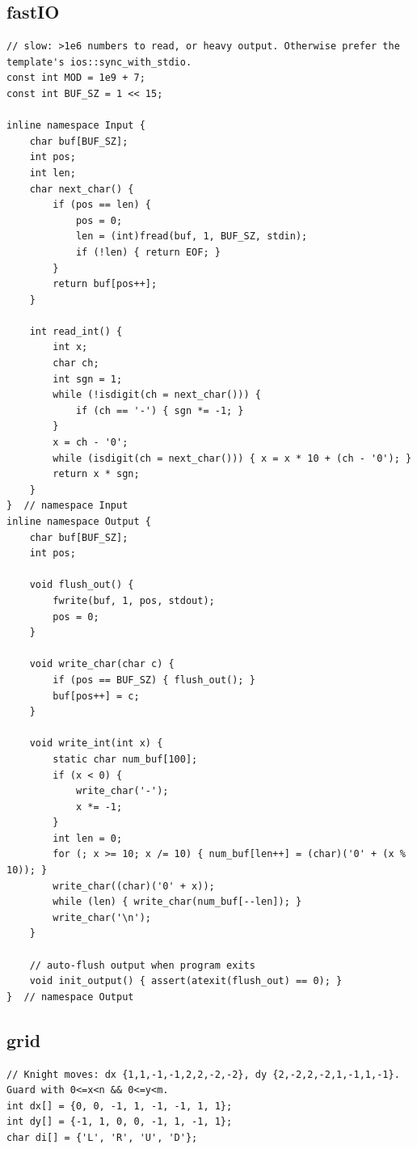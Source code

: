 \documentclass[9pt,a4paper,twocolumn]{extarticle}
\begin{document}
\filbreak
\subsection{fastIO}
\nopagebreak
\begin{lstlisting}
// slow: >1e6 numbers to read, or heavy output. Otherwise prefer the template's ios::sync_with_stdio.
const int MOD = 1e9 + 7;
const int BUF_SZ = 1 << 15;

inline namespace Input {
    char buf[BUF_SZ];
    int pos;
    int len;
    char next_char() {
        if (pos == len) {
            pos = 0;
            len = (int)fread(buf, 1, BUF_SZ, stdin);
            if (!len) { return EOF; }
        }
        return buf[pos++];
    }

    int read_int() {
        int x;
        char ch;
        int sgn = 1;
        while (!isdigit(ch = next_char())) {
            if (ch == '-') { sgn *= -1; }
        }
        x = ch - '0';
        while (isdigit(ch = next_char())) { x = x * 10 + (ch - '0'); }
        return x * sgn;
    }
}  // namespace Input
inline namespace Output {
    char buf[BUF_SZ];
    int pos;

    void flush_out() {
        fwrite(buf, 1, pos, stdout);
        pos = 0;
    }

    void write_char(char c) {
        if (pos == BUF_SZ) { flush_out(); }
        buf[pos++] = c;
    }

    void write_int(int x) {
        static char num_buf[100];
        if (x < 0) {
            write_char('-');
            x *= -1;
        }
        int len = 0;
        for (; x >= 10; x /= 10) { num_buf[len++] = (char)('0' + (x % 10)); }
        write_char((char)('0' + x));
        while (len) { write_char(num_buf[--len]); }
        write_char('\n');
    }

    // auto-flush output when program exits
    void init_output() { assert(atexit(flush_out) == 0); }
}  // namespace Output
\end{lstlisting}

\filbreak
\subsection{grid}
\nopagebreak
\begin{lstlisting}
// Knight moves: dx {1,1,-1,-1,2,2,-2,-2}, dy {2,-2,2,-2,1,-1,1,-1}. Guard with 0<=x<n && 0<=y<m.
int dx[] = {0, 0, -1, 1, -1, -1, 1, 1};
int dy[] = {-1, 1, 0, 0, -1, 1, -1, 1};
char di[] = {'L', 'R', 'U', 'D'};
\end{lstlisting}
\end{document}
